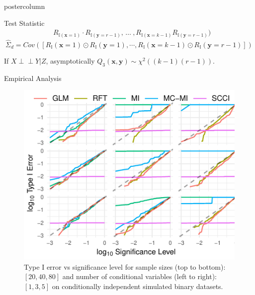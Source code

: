 \documentclass{beamer}
\def\ci{\perp\!\!\!\!\!\perp}
\begin{document}
\begin{frame}
\begin{columns}
\begin{column}{.33\textwidth}
\begin{beamercolorbox}[center]{postercolumn}
\begin{minipage}{.98\textwidth}
{\begin{myblock}{Test Statistic}
\begin{equation*}
\begin{split}
								     &R_{\mathbb{I}(\mathbf{x}=1)} \cdot R_{\mathbb{I}(\mathbf{y}=r-1)}, \, \ldots \ ,
										R_{\mathbb{I}(\mathbf{x}=k-1)} R_{\mathbb{I}(\mathbf{y}=r-1)}) 
								\end{split}
							\end{equation*}
							\begin{equation*}
								\hat{\Sigma}_d = Cov([R_\mathbb{I}(\mathbf{x}=1) \odot R_\mathbb{I}(\mathbf{y}=1), \cdots, R_\mathbb{I}(\mathbf{x}=k-1) \odot R_\mathbb{I}(\mathbf{y}=r-1)])
							\end{equation*}
							
							If $ X \ci Y | Z $, asymptotically $ Q_3(\bm{x}, \bm{y}) \sim \chi^2((k-1)(r-1)) $.

					\end{myblock}\vfill
					\begin{myblock}{Empirical Analysis}
						\begin{figure}
							\centering
							\includegraphics[scale=2.5]{../in_person/imgs/calibration_add_vars.pdf}
							\caption{Type I error vs significance level for sample sizes (top to
							bottom): $ [20, 40, 80] $ and number of conditional variables (left to
							right): $ [1, 3, 5] $ on conditionally independent simulated binary
							datasets.}
							\label{fig:calibration}
						\end{figure}
						\begin{figure}
							\centering

\end{figure}
\end{myblock}}
\end{minipage}
\end{beamercolorbox}
\end{column}
\end{columns}
\end{frame}
\end{document}
